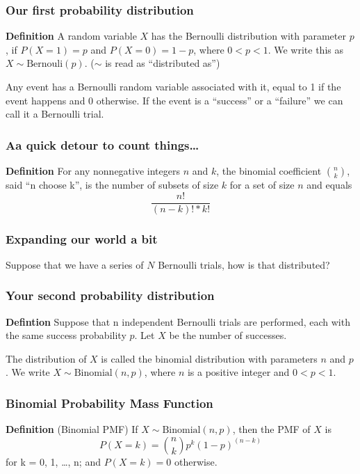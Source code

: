 \documentclass{beamer}
\begin{document}
\begin{frame}
\frametitle{Our first probability distribution}

\textbf{Definition} A random variable $X$ has the Bernoulli distribution with parameter $p$, if $P(X = 1) = p$ and $P(X = 0) = 1 - p$, where $0 < p < 1$. We write this as $X \sim \text{Bernouli}(p)$. ($\sim$ is read as ``distributed as'')

\bigskip

Any event has a Bernoulli random variable associated with it, equal to 1 if the event happens and 0 otherwise. If the event is a ``success'' or a ``failure'' we can call it a Bernoulli trial.

\end{frame}

\begin{frame}
\frametitle{Aa quick detour to count things\ldots}

\textbf{Definition} For any nonnegative integers $n$ and $k$, the binomial coefficient $\binom{n}{k}$, said ``n choose k'', is the number of subsets of size $k$ for a set of size $n$ and equals 
\begin{equation}
	\frac{n!}{(n - k)! * k!}
\end{equation}

\end{frame}


\begin{frame}
\frametitle{Expanding our world a bit}

Suppose that we have a series of $N$ Bernoulli trials, how is that distributed? 

\end{frame}

\begin{frame}
\frametitle{Your second probability distribution}

\textbf{Defintion} Suppose that n independent Bernoulli trials are performed, each with the same success probability $p$. Let $X$ be the number of successes. 

\bigskip

The distribution of $X$ is called the binomial distribution with parameters $n$ and $p$. We write $X \sim \text{Binomial}(n,p)$, where $n$ is a positive integer and $0 < p < 1$.

\end{frame}


\begin{frame}
\frametitle{Binomial Probability Mass Function}

\textbf{Definition} (Binomial PMF) If $X \sim \text{Binomial}(n,p)$, then the PMF of $X$ is 
\begin{equation}
P(X = k) = \binom{n}{k} p^{k} (1-p)^{(n-k)}
\end{equation}
for k = 0, 1, \ldots, n; and $P(X = k) = 0$ otherwise.

\end{frame}
\end{document}
